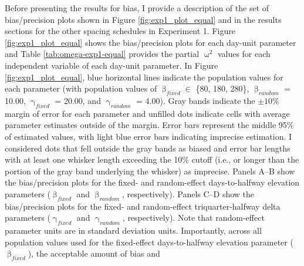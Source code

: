 \documentclass[
12pt, %
twoside,
english]{guelphthesis}
\begin{document}
Before presenting the results for bias, I provide a description of the set of bias/precision plots shown in Figure \ref{fig:exp1_plot_equal} and in the results sections for the other spacing schedules in Experiment 1. Figure \ref{fig:exp1_plot_equal} shows the bias/precision plots for each day-unit parameter and Table \ref{tab:omega-exp1-equal} provides the partial \(\upomega^2\) values for each independent variable of each day-unit parameter. In Figure \ref{fig:exp1_plot_equal}, blue horizontal lines indicate the population values for each parameter (with population values of \(\upbeta_{fixed} \in\) \{80, 180, 280\}, \(\upbeta_{random}\) = 10.00, \(\upgamma_{fixed}\) = 20.00, and \(\upgamma_{random}\) = 4.00). Gray bands indicate the \(\pm 10\%\) margin of error for each parameter and unfilled dots indicate cells with average parameter estimates outside of the margin. Error bars represent the middle 95\% of estimated values, with light blue error bars indicating imprecise estimation. I considered dots that fell outside the gray bands as biased and error bar lengths with at least one whisker length exceeding the 10\% cutoff (i.e., or longer than the portion of the gray band underlying the whisker) as imprecise. Panels A--B show the bias/precision plots for the fixed- and random-effect days-to-halfway elevation parameters (\(\upbeta_{fixed}\) and \(\upbeta_{random}\), respectively). Panels C--D show the bias/precision plots for the fixed- and random-effect triquarter-halfway delta parameters (\(\upgamma_{fixed}\) and \(\upgamma_{random}\), respectively). Note that random-effect parameter units are in standard deviation units. Importantly, across all population values used for the fixed-effect days-to-halfway elevation parameter (\(\upbeta_{fixed}\)), the acceptable amount of bias and
\end{document}
